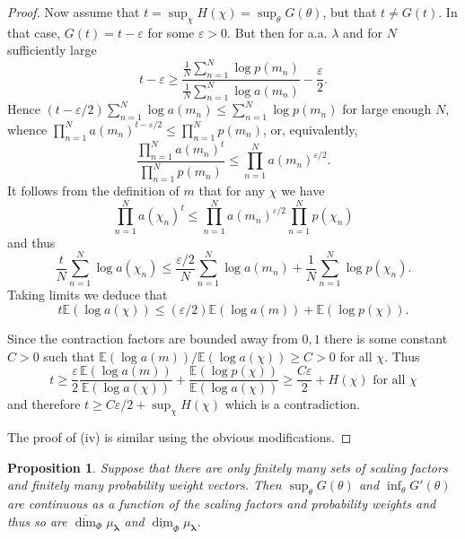 \documentclass{amsart}
\newtheorem{proposition}[theorem]{Proposition}
\theoremstyle{plain}
\numberwithin{equation}{section}
\newcommand{\blambda}{{\boldsymbol{\lambda}}}
\newcommand{\ee}{{\mathbb E}}
\newcommand{\odim}{\overline{\dim}}
\newcommand{\udim}{\underline{\dim}}
\begin{document}
\begin{proof}
Now assume that $t=\sup_{\chi }H(\chi )=\sup_{\theta }G(\theta )$, but that $t\neq G(t)$. 
In that case, $G(t)=t-\varepsilon $ for some $\varepsilon >0$.
But then for a.a. $\lambda $ and for $N$ sufficiently large 
\begin{equation*}
   t-\varepsilon \geq 
    \frac{\frac{1}{N}\sum_{n=1}^{N}\log p(m_{n})}{\frac{1}{N}\sum_{n=1}^{N}\log a(m_{n})}
     -\frac{\varepsilon }{2}.
\end{equation*}
Hence $(t-\varepsilon /2)\sum_{n=1}^{N}\log a(m_{n})\leq \sum_{n=1}^{N}\log p(m_{n})$ 
for large enough $N,$ whence $\prod_{n=1}^{N}a(m_{n})^{t-\varepsilon /2}\leq \prod_{n=1}^{N}p(m_{n})$, 
or, equivalently,
\begin{equation*}
    \frac{\prod_{n=1}^{N}a(m_{n})^{t}}{\prod_{n=1}^{N}p(m_{n})}
        \leq
        \prod_{n=1}^{N}a(m_{n})^{\varepsilon /2}.
\end{equation*}
It follows from the definition of $m$ that for any $\chi $ we have 
\begin{equation*}
         \prod_{n=1}^{N}a(\chi _{n})^{t}\leq \prod_{n=1}^{N}a(m_{n})^{\varepsilon/2}\prod_{n=1}^{N}p(\chi _{n})
\end{equation*}
and thus
\begin{equation*}
     \frac{t}{N}\sum_{n=1}^{N}\log a(\chi _{n})\leq 
         \frac{\varepsilon /2}{N}\sum_{n=1}^{N}\log a(m_{n})+
        \frac{1}{N}\sum_{n=1}^{N}\log p(\chi _{n}).
\end{equation*}
Taking limits we deduce that 
\begin{equation*}
     t\ee(\log a(\chi ))\leq (\varepsilon /2)\ee(\log a(m))+\ee(\log p(\chi )).
\end{equation*}

Since the contraction factors are bounded away from $0,1$ there is some constant $C>0$ 
such that $\ee(\log a(m))/\ee(\log a(\chi))\geq C > 0$ for all $\chi$.
Thus 
\begin{equation*}
     t\geq 
       \frac{\varepsilon }{2}\frac{\ee(\log a(m))}{\ee(\log a(\chi ))}+
       \frac{\ee(\log p(\chi ))}{\ee(\log a(\chi ))}
    \geq   \frac{C\varepsilon }{2}+H(\chi )\text{ for all }\chi 
\end{equation*}%
and therefore $t\geq C\varepsilon /2+\sup_{\chi }H(\chi )$ which is a
contradiction.

The proof of  (iv) is similar using the obvious modifications.
\end{proof}


\begin{proposition} \label{prop:finite_GContinuous}
Suppose that there are only finitely many sets of scaling factors and finitely many probability weight vectors.
Then $\sup_\theta G(\theta)$ and $\inf_\theta G'(\theta)$ are continuous as a function of the scaling factors and probability weights and thus 
so are $\odim_\Phi \mu_\blambda$ and $\udim_\Phi \mu_\blambda$.
\end{proposition}
\end{document}
